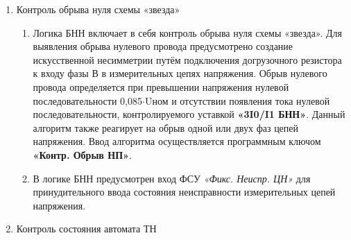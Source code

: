 \begin{enumerate}[label=\arabic{section}.\arabic{subsection}.\arabic{enumi}, labelsep=4pt, leftmargin=0pt, itemindent=57pt, itemsep=0pt, parsep=0pt]
\begin{enumerate}[label=\arabic{section}.\arabic{subsection}.\arabic{enumi}.\arabic*, labelsep=4pt, leftmargin=0em, itemindent=65pt, parsep=0pt]
\item
Сигнал обрыва трех фаз подхватывается энергонезависимым триггером при снижении напряжения прямой последовательности ниже уставки \textbf{«U1 мин БНН»}. Возврат цепи происходит после повторного повышения напряжения прямой последовательности более уставки \textbf{«U1 мин БНН»} (рекомендуемое значение уставки 0,1$\cdot$Uном). Если измерительные ТН установлены на линии, то дополнительно контролируется включенное положение выключателя.

\item
Для контроля одновременного исчезновения трех фазных напряжений используются три реле минимального напряжения в фазах А, В, С. Отсутствие напряжения определяется при снижении всех фазных напряжений меньше уставки \textbf{«Uф мин БНН»} в течение 5 секунд и наличии тока в защищаемой линии, определяемого по сработанному состоянию ИО УРОВ. Отсутствие напряжения действует на формирование сигнала обрыва трех фаз.

\end{enumerate}


\item Контроль обрыва нуля схемы «звезда»
\begin{enumerate}[label=\arabic{section}.\arabic{subsection}.\arabic{enumi}.\arabic*, labelsep=4pt, leftmargin=0em, itemindent=65pt, parsep=0pt]

\item
Логика БНН включает в себя контроль обрыва нуля схемы «звезда». Для выявления обрыва нулевого провода предусмотрено создание искусственной несимметрии путём подключения догрузочного резистора к входу фазы В в измерительных цепях напряжения. Обрыв нулевого провода определяется при превышении напряжения нулевой последовательности 0,085$\cdot$Uном и отсутствии появления тока нулевой последовательности, контролируемого уставкой \textbf{«3I0/I1 БНН»}. Данный алгоритм также реагирует на обрыв одной или двух фаз цепей напряжения. Ввод алгоритма осуществляется программным ключом \textbf{«Контр. Обрыв НП»}.

\item 
В логике БНН предусмотрен вход ФСУ \textit{«Фикс. Неиспр. ЦН»} для принудительного ввода состояния неисправности измерительных цепей напряжения.

\end{enumerate}


\item Контроль состояния автомата ТН 
\begin{enumerate}[label=\arabic{section}.\arabic{subsection}.\arabic{enumi}.\arabic*, labelsep=4pt, leftmargin=0em, itemindent=65pt, parsep=0pt]


\end{enumerate}
\end{enumerate}

